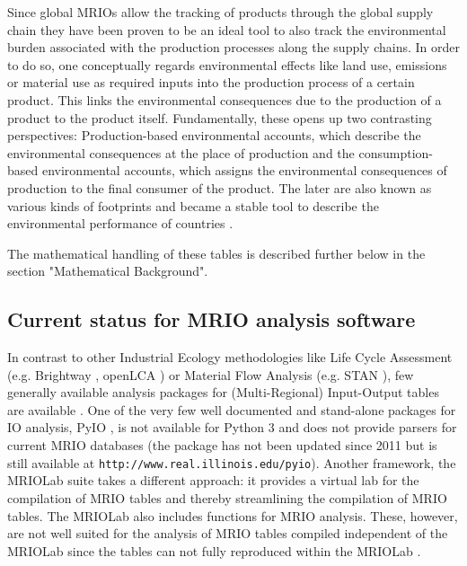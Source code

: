 \documentclass{jors}
\begin{document}
{Since global MRIOs allow the tracking of products through the global supply chain they have been proven to be an ideal tool to also track the environmental burden associated with the production processes along the supply chains. 
In order to do so, one conceptually regards environmental effects like land use, emissions or material use as required inputs into the production process of a certain product. 
This links the environmental consequences due to the production of a product to the product itself. 
Fundamentally, these opens up two contrasting perspectives: Production-based environmental accounts, which describe the environmental consequences at the place of production and the consumption-based environmental accounts, which assigns the environmental consequences of production to the final consumer of the product. 
The later are also known as various kinds of footprints and became a stable tool to describe the environmental performance of countries \cite{tukker2014_Global, ivanova2017_Mapping, giljum2016_Identifying}.

The mathematical handling of these tables is described further below in the section "Mathematical Background".


\subsection*{Current status for MRIO analysis software}

In contrast to other Industrial Ecology methodologies like 
Life Cycle Assessment (e.g. Brightway \cite{mutel2017_Brightway}, openLCA \cite{openlca2018_openLCA})
or Material Flow Analysis (e.g. STAN \cite{cencic2008_Material}), 
few generally available analysis packages for (Multi-Regional) Input-Output tables are available \cite{pauliuk2015_Lifting}. One of the very few well documented and stand-alone packages for IO analysis, PyIO \cite{nazara2003_PyIO}, is not available for Python 3 and does not provide parsers for current MRIO databases (the package has not been updated since 2011 but is still available at \texttt{http://www.real.illinois.edu/pyio}). Another framework, the MRIOLab suite \cite{lenzen2017_Global, geschke2017_Virtual} takes a different approach: it provides a virtual lab for the compilation of MRIO tables and thereby streamlining the compilation of MRIO tables. The MRIOLab also includes functions for MRIO analysis. These, however, are not well suited for the analysis of MRIO tables compiled independent of the MRIOLab since the tables can not fully reproduced within the MRIOLab \cite{reyes2017_Virtual, rahman2017_flexible}.

}
\end{document}
